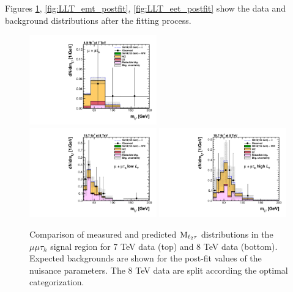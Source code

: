 Figures \ref{fig:LLT_mmt_postfit}, \ref{fig:LLT_emt_postfit}, \ref{fig:LLT_eet_postfit} show the data and background distributions after the fitting process.

\begin{figure}
\begin{center}
  \includegraphics[width=0.49\textwidth]{4_Analisys/pics/postfit/mmt_postfit_7TeV_FitAllChannels.pdf}\\
  \includegraphics[width=0.49\textwidth]{4_Analisys/pics/postfit/mmt_low_postfit_8TeV_FitAllChannels.pdf}
  \includegraphics[width=0.49\textwidth]{4_Analisys/pics/postfit/mmt_high_postfit_8TeV_FitAllChannels.pdf}\\
  \caption{Comparison of measured and predicted $\rm{M}_{\ell_2\tau}$ distributions in the $\mu\mu\tau_h$ signal region for 7 TeV data (top) and 8 TeV data (bottom). 
  Expected backgrounds are shown for the post-fit values of the nuisance parameters. 
  The 8 TeV data are split according the optimal categorization.}
  \label{fig:LLT_mmt_postfit}
\end{center}
\end{figure}

